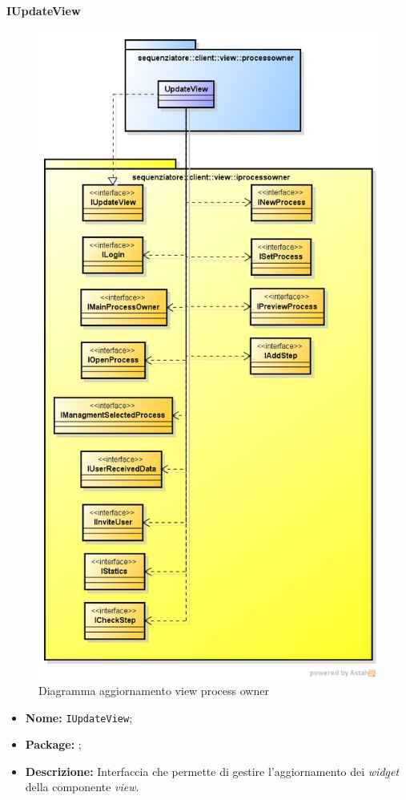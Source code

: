 \paragraph{IUpdateView}
\begin{figure}[H] \centering \includegraphics[scale=0.5]
{./pack/UpdateViewPo.png} \caption{Diagramma aggiornamento view process owner}
\end{figure}
\begin{itemize}
\item \textbf{Nome:} \texttt{IUpdateView};
\item \textbf{Package:} \texttt{\iViewAdmin{}};
\item \textbf{Descrizione:} Interfaccia che permette di gestire l'aggiornamento dei \textit{widget} della componente \textit{view}.
\end{itemize}

